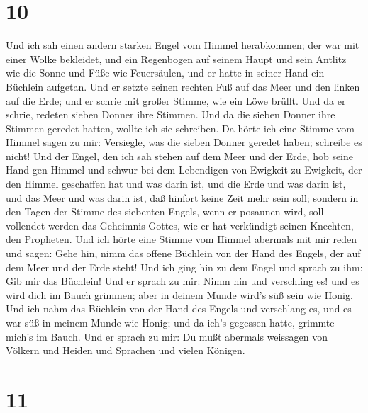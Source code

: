 \hypertarget{section-9}{%
\section{10}\label{section-9}}

 Und ich sah einen andern starken Engel vom Himmel
herabkommen; der war mit einer Wolke bekleidet, und ein Regenbogen auf
seinem Haupt und sein Antlitz wie die Sonne und Füße wie Feuersäulen,
 und er hatte in seiner Hand ein Büchlein aufgetan. Und er
setzte seinen rechten Fuß auf das Meer und den linken auf die Erde;
 und er schrie mit großer Stimme, wie ein Löwe brüllt. Und
da er schrie, redeten sieben Donner ihre Stimmen.  Und da
die sieben Donner ihre Stimmen geredet hatten, wollte ich sie schreiben.
Da hörte ich eine Stimme vom Himmel sagen zu mir: Versiegle, was die
sieben Donner geredet haben; schreibe es nicht!  Und der
Engel, den ich sah stehen auf dem Meer und der Erde, hob seine Hand gen
Himmel  und schwur bei dem Lebendigen von Ewigkeit zu
Ewigkeit, der den Himmel geschaffen hat und was darin ist, und die Erde
und was darin ist, und das Meer und was darin ist, daß hinfort keine
Zeit mehr sein soll;  sondern in den Tagen der Stimme des
siebenten Engels, wenn er posaunen wird, soll vollendet werden das
Geheimnis Gottes, wie er hat verkündigt seinen Knechten, den Propheten.
 Und ich hörte eine Stimme vom Himmel abermals mit mir reden
und sagen: Gehe hin, nimm das offene Büchlein von der Hand des Engels,
der auf dem Meer und der Erde steht!  Und ich ging hin zu
dem Engel und sprach zu ihm: Gib mir das Büchlein! Und er sprach zu mir:
Nimm hin und verschling es! und es wird dich im Bauch grimmen; aber in
deinem Munde wird's süß sein wie Honig.  Und ich nahm das
Büchlein von der Hand des Engels und verschlang es, und es war süß in
meinem Munde wie Honig; und da ich's gegessen hatte, grimmte mich's im
Bauch.  Und er sprach zu mir: Du mußt abermals weissagen
von Völkern und Heiden und Sprachen und vielen Königen.

\hypertarget{section-10}{%
\section{11}\label{section-10}}

